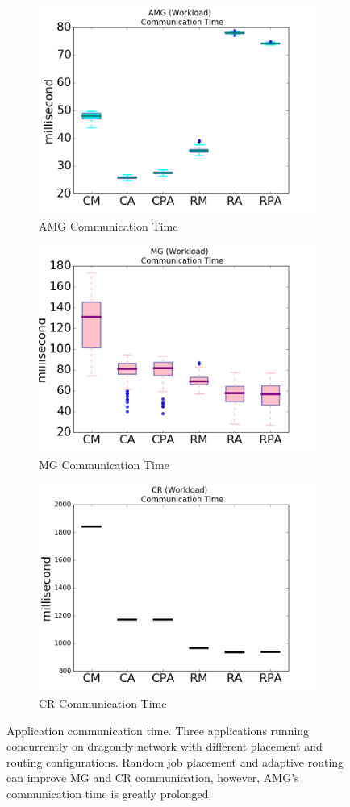 \documentclass[conference,compsoc]{IEEEtran}
\begin{document}
\begin{figure}[t!]
    \centering
    \begin{subfigure}[t]{0.32\textwidth}
        \centering
        \includegraphics[height=1.5 in]{amg/commtime}
        \caption{AMG Communication Time}
        \label{fig:amg-commtime}
    \end{subfigure}%
    \hspace{1em}%
    \begin{subfigure}[t]{0.32\textwidth}
        \centering
        \includegraphics[height=1.5 in]{mg/commtime}
        \caption{MG Communication Time}
        \label{fig:mg-commtime}
    \end{subfigure}%
    \begin{subfigure}[t]{0.32\textwidth}
        \centering
        \includegraphics[height=1.5 in]{cr/commtime}
        \caption{CR Communication Time}
        \label{fig:cr-commtime}
    \end{subfigure}%
   \caption{Application communication time. Three applications running concurrently on dragonfly network with different placement and routing configurations. Random job placement and adaptive routing can improve MG and CR communication, however, AMG's communication time is greatly prolonged.}
   \label{fig:apps-commtime}
\end{figure}
\end{document}
